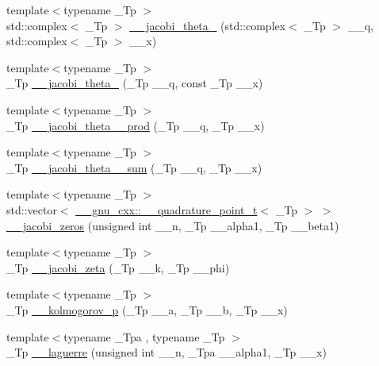 \begin{DoxyCompactItemize}
\item 
{\footnotesize template$<$typename \+\_\+\+Tp $>$ }\\std\+::complex$<$ \+\_\+\+Tp $>$ \hyperlink{namespacestd_1_1____detail_a1cb3d69015e808baeaf98cd3310f38c3}{\+\_\+\+\_\+jacobi\+\_\+theta\+\_} (std\+::complex$<$ \+\_\+\+Tp $>$ \+\_\+\+\_\+q, std\+::complex$<$ \+\_\+\+Tp $>$ \+\_\+\+\_\+x)
\item 
{\footnotesize template$<$typename \+\_\+\+Tp $>$ }\\\+\_\+\+Tp \hyperlink{namespacestd_1_1____detail_a0e4199a4d77f33d27b09063b25c99b7f}{\+\_\+\+\_\+jacobi\+\_\+theta\+\_} (\+\_\+\+Tp \+\_\+\+\_\+q, const \+\_\+\+Tp \+\_\+\+\_\+x)
\item 
{\footnotesize template$<$typename \+\_\+\+Tp $>$ }\\\+\_\+\+Tp \hyperlink{namespacestd_1_1____detail_a577345a46215dd84c03eb4c760dbf7f4}{\+\_\+\+\_\+jacobi\+\_\+theta\+\_\+\_\+prod} (\+\_\+\+Tp \+\_\+\+\_\+q, \+\_\+\+Tp \+\_\+\+\_\+x)
\item 
{\footnotesize template$<$typename \+\_\+\+Tp $>$ }\\\+\_\+\+Tp \hyperlink{namespacestd_1_1____detail_a6f1dd356335537ad693089ccb8d8c755}{\+\_\+\+\_\+jacobi\+\_\+theta\+\_\+\_\+sum} (\+\_\+\+Tp \+\_\+\+\_\+q, \+\_\+\+Tp \+\_\+\+\_\+x)
\item 
{\footnotesize template$<$typename \+\_\+\+Tp $>$ }\\std\+::vector$<$ \hyperlink{struct____gnu__cxx_1_1____quadrature__point__t}{\+\_\+\+\_\+gnu\+\_\+cxx\+::\+\_\+\+\_\+quadrature\+\_\+point\+\_\+t}$<$ \+\_\+\+Tp $>$ $>$ \hyperlink{namespacestd_1_1____detail_a53800598007d45e144cf147c2408a3d6}{\+\_\+\+\_\+jacobi\+\_\+zeros} (unsigned int \+\_\+\+\_\+n, \+\_\+\+Tp \+\_\+\+\_\+alpha1, \+\_\+\+Tp \+\_\+\+\_\+beta1)
\item 
{\footnotesize template$<$typename \+\_\+\+Tp $>$ }\\\+\_\+\+Tp \hyperlink{namespacestd_1_1____detail_a1d5fc69202703d72974c4370fd7ade03}{\+\_\+\+\_\+jacobi\+\_\+zeta} (\+\_\+\+Tp \+\_\+\+\_\+k, \+\_\+\+Tp \+\_\+\+\_\+phi)
\item 
{\footnotesize template$<$typename \+\_\+\+Tp $>$ }\\\+\_\+\+Tp \hyperlink{namespacestd_1_1____detail_a826af8d14ad1914733d751cbb4561957}{\+\_\+\+\_\+kolmogorov\+\_\+p} (\+\_\+\+Tp \+\_\+\+\_\+a, \+\_\+\+Tp \+\_\+\+\_\+b, \+\_\+\+Tp \+\_\+\+\_\+x)
\item 
{\footnotesize template$<$typename \+\_\+\+Tpa , typename \+\_\+\+Tp $>$ }\\\+\_\+\+Tp \hyperlink{namespacestd_1_1____detail_a9e0b69452cb6c0ca0115c516afd46816}{\+\_\+\+\_\+laguerre} (unsigned int \+\_\+\+\_\+n, \+\_\+\+Tpa \+\_\+\+\_\+alpha1, \+\_\+\+Tp \+\_\+\+\_\+x)

\end{DoxyCompactItemize}

